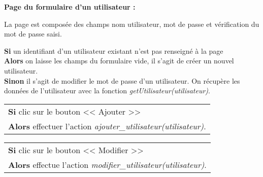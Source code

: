             
            \begin{paragraphe}
                \textbf{Page du formulaire d'un utilisateur :}
            \end{paragraphe}
            
            \begin{paragraphe}
                La page est composée des champs nom utilisateur, mot de passe et vérification du mot de passe saisi.
            \end{paragraphe}

            \begin{paragraphe}
                \textbf{Si} un identifiant d'un utilisateur existant n'est pas renseigné à la page \\
                \textbf{Alors} on laisse les champs du formulaire vide, il s'agit de créer un nouvel utilisateur. \\
                \textbf{Sinon} il s'agit de modifier le mot de passe d'un utilisateur. On récupère les données de l'utilisateur avec la fonction \emph{getUtilisateur(utilisateur)}.
            \end{paragraphe}
            
            \begin{center}
                \begin{tabular}{l}
                    \textbf{Si} clic sur le bouton << Ajouter >> \\
                    \textbf{Alors} effectuer l'action \emph{ajouter\_utilisateur(utilisateur)}.
                \end{tabular}
            \end{center}
            
            
        \newpage
            
            \begin{center}
                \begin{tabular}{l}
                    \textbf{Si} clic sur le bouton << Modifier >> \\
                    \textbf{Alors} effectue l'action \emph{modifier\_utilisateur(utilisateur)}.
                \end{tabular}
            \end{center}
            
